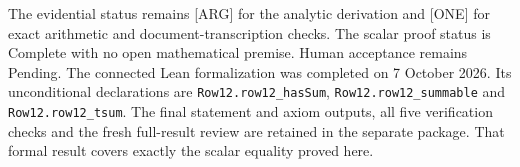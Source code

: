 \documentclass[11pt,a4paper]{article}
\begin{document}
The evidential status remains [ARG] for the analytic derivation and [ONE]
for exact arithmetic and document-transcription checks. The scalar proof
status is Complete with no open mathematical premise. Human acceptance
remains Pending.
The connected Lean formalization was completed on 7 October 2026. Its
unconditional declarations are \texttt{Row12.row12\_hasSum},
\texttt{Row12.row12\_summable} and \texttt{Row12.row12\_tsum}.
The final statement and axiom outputs, all five verification checks and the
fresh full-result review are retained in the separate
 package. That formal result covers exactly
the scalar equality proved here.
\end{document}
